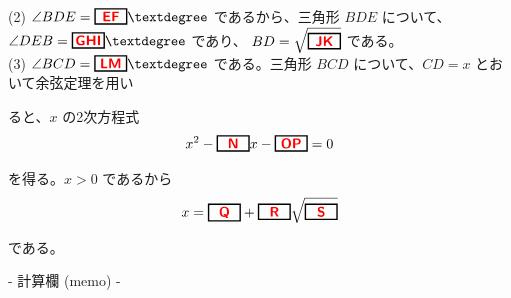 \documentclass[dvipdfmx,twoside]{jsarticle}
\newcommand{\ab}[1]{%
\begin{tikzpicture}[baseline]
\node[draw=black, 
      rectangle, 
      minimum width=0.8cm, 
      minimum height=0.3cm, 
      font=\bfseries,
      line width=1pt,
      inner sep=2pt,
      anchor=base] {#1};
\end{tikzpicture}%
}
\begin{document}
\begin{CJK}{UTF8}{ipxm}
\noindent
(2) \quad $\angle BDE = \ab{\color{red}{\textsf{EF}}}°$ であるから、三角形 $BDE$ について、$\angle DEB = \ab{\color{red}{\textsf{GHI}}}°$ であり、
$BD = \sqrt{\ab{\color{red}{\textsf{JK}}}}$ である。\\[0.5em]

\noindent
(3) \quad $\angle BCD = \ab{\color{red}{\textsf{LM}}}°$ である。三角形 $BCD$ について、$CD = x$ とおいて余弦定理を用い

ると、$x$ の2次方程式\\[0.5em]

$$x^2 - \ab{\color{red}{\textsf{N}}}x - \ab{\color{red}{\textsf{OP}}} = 0$$

を得る。$x > 0$ であるから\\[0.5em]

$$x = \ab{\color{red}{\textsf{Q}}}+\ab{\color{red}{\textsf{R}}} \sqrt{\ab{\color{red}{\textsf{S}}}}$$

である。\\[0.5em]


\newpage
\begin{center}
- 計算欄 (memo) -
\end{center}
\end{CJK}
\end{document}
